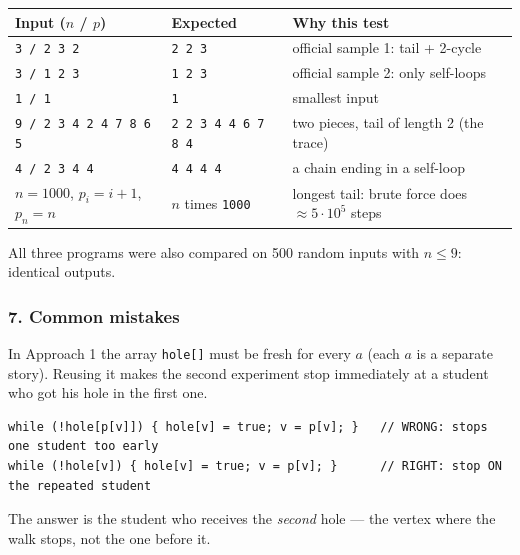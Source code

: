 \begin{testbox}
\centering\small
\begin{tabular}{@{}lll@{}}
\toprule
\textbf{Input ($n$ / $p$)} & \textbf{Expected} & \textbf{Why this test} \\
\midrule
\texttt{3 / 2 3 2} & \texttt{2 2 3} & official sample 1: tail + 2-cycle \\
\texttt{3 / 1 2 3} & \texttt{1 2 3} & official sample 2: only self-loops \\
\texttt{1 / 1} & \texttt{1} & smallest input \\
\texttt{9 / 2 3 4 2 4 7 8 6 5} & \texttt{2 2 3 4 4 6 7 8 4} & two pieces, tail of length 2 (the trace) \\
\texttt{4 / 2 3 4 4} & \texttt{4 4 4 4} & a chain ending in a self-loop \\
$n = 1000$, $p_i = i+1$, $p_n = n$ & $n$ times \texttt{1000} & longest tail: brute force does $\approx 5\cdot10^5$ steps \\
\bottomrule
\end{tabular}
\end{testbox}

All three programs were also compared on 500 random inputs with $n \le 9$: identical outputs.

\subsubsection*{7. Common mistakes}

\begin{warningbox}
In Approach 1 the array \texttt{hole[]} must be fresh for every $a$ (each $a$ is a separate story). Reusing it makes the second experiment stop immediately at a student who got his hole in the first one.
\end{warningbox}

\begin{warningbox}
\begin{lstlisting}[style=snippet]
while (!hole[p[v]]) { hole[v] = true; v = p[v]; }   // WRONG: stops one student too early
while (!hole[v]) { hole[v] = true; v = p[v]; }      // RIGHT: stop ON the repeated student
\end{lstlisting}
The answer is the student who receives the \emph{second} hole --- the vertex where the walk stops, not the one before it.
\end{warningbox}

